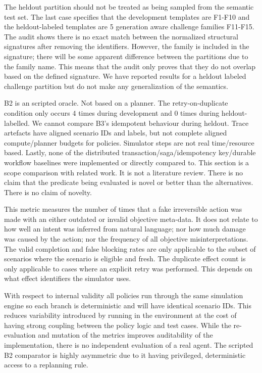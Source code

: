 \documentclass[conference]{IEEEtran}
\begin{document}
The heldout partition should not be treated as being sampled from the semantic test set. The last case specifies that the development templates are F1-F10 and the heldout-labeled templates are 5 generation aware challenge families F11-F15. The audit shows there is no exact match between the normalized structural signatures after removing the identifiers. However, the family is included in the signature; there will be some apparent difference between the partitions due to the family name. This means that the audit only proves that they do not overlap based on the defined signature. We have reported results for a heldout labeled challenge partition but do not make any generalization of the semantics.

B2 is an scripted oracle. Not based on a planner. The retry-on-duplicate condition only occurs 4 times during development and 0 times during heldout-labelled. We cannot compare B3's idempotent behaviour during heldout. Trace artefacts have aligned scenario IDs and labels, but not complete aligned compute/planner budgets for policies. Simulator steps are not real time/resource based. Lastly, none of the distributed transaction/saga/idempotency key/durable workflow baselines were implemented or directly compared to. This section is a scope comparison with related work. It is not a literature review. There is no claim that the predicate being evaluated is novel or better than the alternatives. There is no claim of novelty.

This metric measures the number of times that a fake irreversible action was made with an either outdated or invalid objective meta-data. It does not relate to how well an intent was inferred from natural language; nor how much damage was caused by the action; nor the frequency of all objective misinterpretations. The valid completion and false blocking rates are only applicable to the subset of scenarios where the scenario is eligible and fresh. The duplicate effect count is only applicable to cases where an explicit retry was performed. This depends on what effect identifiers the simulator uses.

With respect to internal validity all policies run through the same simulation engine so each branch is deterministic and will have identical scenario IDs. This reduces variability introduced by running in the environment at the cost of having strong coupling between the policy logic and test cases. While the re-evaluation and mutation of the metrics improves auditability of the implementation, there is no independent evaluation of a real agent. The scripted B2 comparator is highly asymmetric due to it having privileged, deterministic access to a replanning rule.
\end{document}
